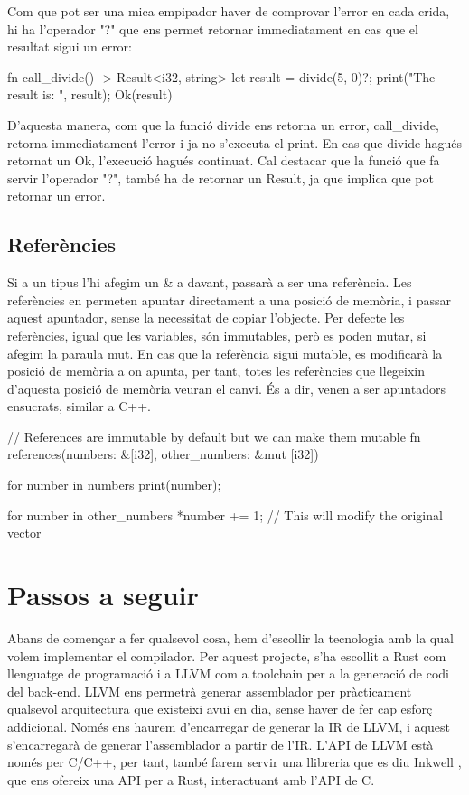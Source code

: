 ﻿\documentclass{article}
\begin{document}
Com que pot ser una mica empipador haver de comprovar l'error en cada crida, hi
ha l'operador "?" que ens permet retornar immediatament en cas que el resultat
sigui un error:

\begin{code}
fn call_divide() -> Result<i32, string> {
    let result = divide(5, 0)?;
    print("The result is: ", result);
    Ok(result)
}
\end{code}

D'aquesta manera, com que la funció divide ens retorna un error, call\_divide,
retorna immediatament l'error i ja no s'executa el print. En cas que divide hagués
retornat un Ok, l'execució hagués continuat. Cal destacar que la funció que 
fa servir l'operador "?", també ha de retornar un Result, ja que implica que pot
retornar un error.

\subsection{Referències}

Si a un tipus l'hi afegim un {\ttfamily \&} a davant, passarà a ser una referència. Les
referències en permeten apuntar directament a una posició de memòria, i passar
aquest apuntador, sense la necessitat de copiar l'objecte. Per defecte les
referències, igual que les variables, són immutables, però es poden mutar, si
afegim la paraula mut. En cas que la referència sigui mutable, es modificarà
la posició de memòria a on apunta, per tant, totes les referències que llegeixin
d'aquesta posició de memòria veuran el canvi. És a dir, venen a ser apuntadors
ensucrats, similar a C++.

\begin{code}
// References are immutable by default but we can make them mutable
fn references(numbers: &[i32], other_numbers: &mut [i32]) {
    for number in numbers {
        print(number);
    }

    for number in other_numbers {
        *number += 1; // This will modify the original vector
    }
}
\end{code}

\section{Passos a seguir}

Abans de començar a fer qualsevol cosa, hem d'escollir la tecnologia amb la qual
volem implementar el compilador. Per aquest projecte, s'ha escollit a Rust com
llenguatge de programació i a LLVM \cite{llvm_website} com a toolchain per a la generació de codi
del back-end. LLVM ens permetrà generar assemblador per pràcticament qualsevol
arquitectura que existeixi avui en dia, sense haver de fer cap esforç addicional.
Només ens haurem d'encarregar de generar la IR de LLVM, i aquest s'encarregarà de
generar l'assemblador a partir de l'IR. L'API de LLVM està només per C/C++, per
tant, també farem servir una llibreria que es diu Inkwell \cite{inkwell}, que ens ofereix una
API per a Rust, interactuant amb l'API de C.
\end{document}
